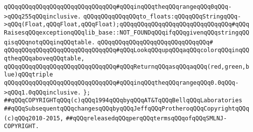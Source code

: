 \verb|qQQqqQQqqQQqqQQqqQQqqQQqqQQqqQQq#qQQqinqQQqtheqQQqrangeqQQq0qQQq->qQQq255qQQqinclusive.|\newline
\newline
\verb|qQQqqQQqqQQqqQQqto_floats:qQQqqQQqStringqQQq->qQQq(Float,qQQqFloat,qQQqFloat);qQQqqQQqqQQqqQQqqQQqqQQqqQQqqQQq#qQQqRaisesqQQqexceptionqQQqlib_base::NOT_FOUNDqQQqifqQQqgivenqQQqstringqQQqisqQQqnotqQQqinqQQqtable.|\newline
\verb|qQQqqQQqqQQqqQQqqQQqqQQqqQQqqQQq#|\newline
\verb|qQQqqQQqqQQqqQQqqQQqqQQqqQQqqQQq#qQQqLookqQQqupqQQqaqQQqcolorqQQqinqQQqtheqQQqaboveqQQqtable,|\newline
\verb|qQQqqQQqqQQqqQQqqQQqqQQqqQQqqQQq#qQQqReturnqQQqasqQQqaqQQq(red,green,blue)qQQqtriple|\newline
\verb|qQQqqQQqqQQqqQQqqQQqqQQqqQQqqQQq#qQQqinqQQqtheqQQqrangeqQQq0.0qQQq->qQQq1.0qQQqinclusive.|\newline
\verb|};|\newline
\newline
\newline
\verb|##qQQqCOPYRIGHTqQQq(c)qQQq1994qQQqbyqQQqAT&TqQQqBellqQQqLaboratories|\newline
\verb|##qQQqSubsequentqQQqchangesqQQqbyqQQqJeffqQQqProtheroqQQqCopyrightqQQq(c)qQQq2010-2015,|\newline
\verb|##qQQqreleasedqQQqperqQQqtermsqQQqofqQQqSMLNJ-COPYRIGHT.|\newline

